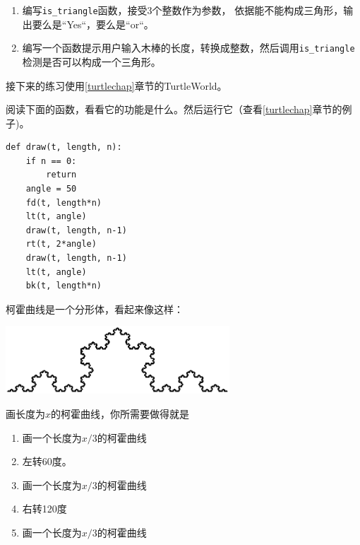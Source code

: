 {{\begin{ex}
\begin{enumerate}
\item 编写\verb"is_triangle"函数，接受3个整数作为参数， 依据能不能构成三角形，输出要么是“Yes“，要么是“or“。

\item 编写一个函数提示用户输入木棒的长度，转换成整数，然后调用\verb"is_triangle"检测是否可以构成一个三角形。

\end{enumerate}

\end{ex}

接下来的练习使用\ref{turtlechap}章节的TurtleWorld。

\begin{ex}

阅读下面的函数，看看它的功能是什么。然后运行它（查看\ref{turtlechap}章节的例子)。

\beforeverb
\begin{verbatim}
def draw(t, length, n):
    if n == 0:
        return
    angle = 50
    fd(t, length*n)
    lt(t, angle)
    draw(t, length, n-1)
    rt(t, 2*angle)
    draw(t, length, n-1)
    lt(t, angle)
    bk(t, length*n)
\end{verbatim}
\afterverb

\end{ex}

\begin{ex}

柯霍曲线是一个分形体，看起来像这样：

\beforefig
\centerline{\includegraphics[height=1in]{figs/koch.eps}}
\afterfig

画长度为$x$的柯霍曲线，你所需要做得就是
\begin{enumerate}

\item 画一个长度为$x/3$的柯霍曲线

\item 左转60度。

\item 画一个长度为$x/3$的柯霍曲线

\item 右转120度

\item 画一个长度为$x/3$的柯霍曲线


\end{enumerate}
\end{ex}}}
